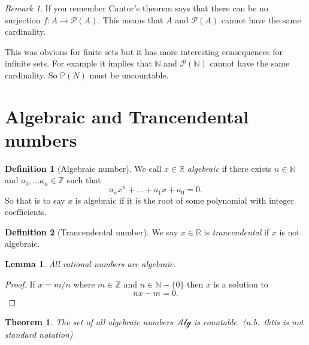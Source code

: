 \documentclass[
]{book}
\newtheorem{theorem}{Theorem}[chapter]
\newtheorem{lemma}{Lemma}[chapter]
\theoremstyle{definition}
\newtheorem{definition}{Definition}[chapter]
\theoremstyle{definition}
\theoremstyle{definition}
\theoremstyle{definition}
\theoremstyle{remark}
\newtheorem*{remark}{Remark}
\begin{document}
\begin{remark}
If you remember Cantor's theorem says that there can be no surjection \(f: A \rightarrow \mathcal{P}(A)\). This means that \(A\) and \(\mathcal{P}(A)\) cannot have the same cardinality.

This was obvious for finite sets but it has more interesting consequences for infinite sets. For example it implies that \(\mathbb{N}\) and \(\mathcal{P}(\mathbb{N})\) cannot have the same cardinality. So \(\mathbb{P}(N)\) must be uncountable.
\end{remark}

\section{Algebraic and Trancendental numbers}\label{algebraic-and-trancendental-numbers}

\begin{definition}[Algebraic number]
We call \(x \in \mathbb{R}\) \emph{algebraic} if there exists \(n \in \mathbb{N}\) and \(a_0, \dots a_n \in \mathbb{Z}\) such that
\[ a_n x^n + \dots + a_1 x + a_0 = 0.  \]
So that is to say \(x\) is algebraic if it is the root of some polynomial with integer coefficients.
\end{definition}

\begin{definition}[Trancendental number]
We say \(x \in \mathbb{R}\) is \emph{trancendental} if \(x\) is not algebraic.
\end{definition}

\begin{lemma}
All rational numbers are algebraic.
\end{lemma}

\begin{proof}
If \(x = m/n\) where \(m \in \mathbb{Z}\) and \(n \in \mathbb{N} - \{0\}\) then \(x\) is a solution to \[nx-m=0.\]
\end{proof}

\begin{theorem}
The set of all algebraic numbers \(\mathcal{Alg}\) is countable. (n.b.~thtis is not standard notation)
\end{theorem}
\end{document}
